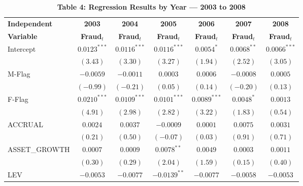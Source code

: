 \documentclass[12pt]{article}
\newcommand{\sig}[1]{\cellcolor{siggreen}#1}
\begin{document}
\newpage


\begin{table}[h!]
\centering
\caption*{\textbf{Table 4: Regression Results by Year — 2003 to 2008}}
\begin{threeparttable}
\setlength{\tabcolsep}{5pt}
\begin{tabular}{lcccccc}
\toprule
\textbf{Independent} & \textbf{2003} & \textbf{2004} & \textbf{2005} &
  \textbf{2006} & \textbf{2007} & \textbf{2008} \\
\textbf{Variable}    & \textbf{Fraud}$_t$ & \textbf{Fraud}$_t$ & \textbf{Fraud}$_t$ &
  \textbf{Fraud}$_t$ & \textbf{Fraud}$_t$ & \textbf{Fraud}$_t$ \\
\midrule
Intercept
  & \sig{$0.0123^{***}$} & \sig{$0.0116^{***}$} & \sig{$0.0116^{***}$}
  & $0.0054^{*}$         & \sig{$0.0068^{**}$}  & \sig{$0.0066^{***}$} \\
  & \sig{$(3.43)$}       & \sig{$(3.30)$}        & \sig{$(3.27)$}
  & $(1.94)$             & \sig{$(2.52)$}        & \sig{$(3.05)$}        \\[4pt]
M-Flag
  & $-0.0059$    & $-0.0011$    & $0.0003$    & $0.0006$    & $-0.0008$   & $0.0005$ \\
  & $(-0.99)$    & $(-0.21)$    & $(0.05)$    & $(0.14)$    & $(-0.20)$   & $(0.13)$ \\[4pt]
F-Flag
  & \sig{$0.0210^{***}$} & \sig{$0.0109^{***}$} & \sig{$0.0101^{***}$}
  & \sig{$0.0089^{***}$} & $0.0048^{*}$         & $0.0013$               \\
  & \sig{$(4.91)$}       & \sig{$(2.98)$}        & \sig{$(2.82)$}
  & \sig{$(3.22)$}       & $(1.83)$              & $(0.54)$               \\[4pt]
ACCRUAL
  & $0.0024$    & $0.0037$    & $-0.0009$   & $0.0001$    & $0.0075$    & $0.0031$ \\
  & $(0.21)$    & $(0.50)$    & $(-0.07)$   & $(0.03)$    & $(0.91)$    & $(0.71)$ \\[4pt]
ASSET\_GROWTH
  & $0.0007$    & $0.0009$    & \sig{$0.0078^{**}$} & $0.0049$   & $0.0003$   & $0.0011$ \\
  & $(0.30)$    & $(0.29)$    & \sig{$(2.04)$}       & $(1.59)$   & $(0.15)$   & $(0.40)$ \\[4pt]
LEV
  & $-0.0053$   & $-0.0077$   & \sig{$-0.0139^{**}$} & $-0.0077$  & $-0.0058$  & $-0.0053$ \\

\end{tabular}
\end{threeparttable}
\end{table}
\end{document}
